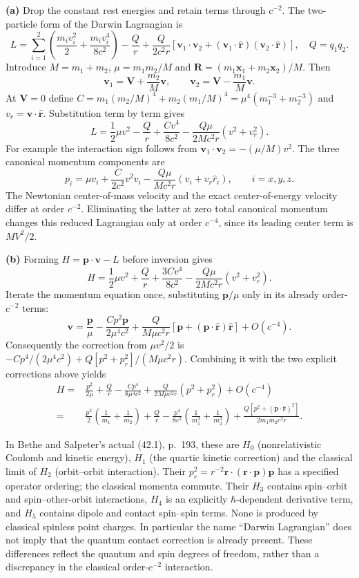 \medskip\noindent\textbf{(a)} Drop the constant rest energies and retain terms through $c^{-2}$.
The two-particle form of the Darwin Lagrangian is
\[
L=\sum_{i=1}^2\left(\frac{m_iv_i^2}2+\frac{m_iv_i^4}{8c^2}\right)
-\frac{Q}{r}+\frac{Q}{2c^2r}
 [\mathbf v_1\cdot\mathbf v_2+
 (\mathbf v_1\cdot\hat{\mathbf r})(\mathbf v_2\cdot\hat{\mathbf r})],
\quad Q=q_1q_2.
\]
Introduce $M=m_1+m_2$, $\mu=m_1m_2/M$ and
$\mathbf R=(m_1\mathbf x_1+m_2\mathbf x_2)/M$.
Then
\[
\mathbf v_1=\mathbf V+\frac{m_2}{M}\mathbf v,\qquad
\mathbf v_2=\mathbf V-\frac{m_1}{M}\mathbf v.
\]
At $\mathbf V=0$ define
$C=m_1(m_2/M)^4+m_2(m_1/M)^4
=\mu^4(m_1^{-3}+m_2^{-3})$ and $v_r=\mathbf v\cdot\hat{\mathbf r}$.
Substitution term by term gives
\[
\boxed{L=\frac12\mu v^2-\frac Qr+
 \frac{C v^4}{8c^2}-\frac{Q\mu}{2Mc^2r}(v^2+v_r^2).}
\]
For example the interaction sign follows from
$\mathbf v_1\cdot\mathbf v_2=-(\mu/M)v^2$.
The three canonical momentum components are
\[
\boxed{p_i=\mu v_i+\frac{C}{2c^2}v^2v_i
-\frac{Q\mu}{Mc^2r}(v_i+v_r\hat r_i),\qquad i=x,y,z.}
\]
The Newtonian center-of-mass velocity and the exact center-of-energy
velocity differ at order $c^{-2}$.  Eliminating the latter at zero
total canonical momentum changes this reduced Lagrangian only at
order $c^{-4}$, since its leading center term is $M V^2/2$.

\medskip\noindent\textbf{(b)} Forming $H=\mathbf p\cdot\mathbf v-L$ before inversion gives
\[
H=\frac12\mu v^2+\frac Qr+
 \frac{3Cv^4}{8c^2}-\frac{Q\mu}{2Mc^2r}(v^2+v_r^2).
\]
Iterate the momentum equation once, substituting $\mathbf p/\mu$
only in its already order-$c^{-2}$ terms:
\[
\mathbf v=\frac{\mathbf p}{\mu}
-\frac{C p^2\mathbf p}{2\mu^4c^2}
+\frac{Q}{M\mu c^2r}
 [\mathbf p+(\mathbf p\cdot\hat{\mathbf r})\hat{\mathbf r}]
+O(c^{-4}).
\]
Consequently the correction from $\mu v^2/2$ is
$-Cp^4/(2\mu^4c^2)+Q[p^2+p_r^2]/(M\mu c^2r)$.
Combining it with the two explicit corrections above yields
\begin{align*}
H={}&\frac{p^2}{2\mu}+\frac Qr
-\frac{Cp^4}{8\mu^4c^2}
+\frac{Q}{2M\mu c^2r}(p^2+p_r^2)+O(c^{-4})\\
={}&\boxed{\frac{p^2}{2}\left(\frac1{m_1}+\frac1{m_2}\right)+\frac Qr
-\frac{p^4}{8c^2}\left(\frac1{m_1^3}+\frac1{m_2^3}\right)
+\frac{Q[p^2+(\mathbf p\cdot\hat{\mathbf r})^2]}
 {2m_1m_2c^2r}.}
\end{align*}

In Bethe and Salpeter's actual (42.1), p.~193, these are $H_0$
(nonrelativistic Coulomb and kinetic energy), $H_1$ (the quartic
kinetic correction) and the classical limit of $H_2$ (orbit--orbit
interaction).  Their $p_r^2=r^{-2}\mathbf r\cdot(\mathbf r\cdot\mathbf p)\mathbf p$
has a specified operator ordering; the classical momenta commute.
Their $H_3$ contains spin--orbit and spin--other-orbit interactions,
$H_4$ is an explicitly $\hbar$-dependent derivative term, and $H_5$
contains dipole and contact spin--spin terms.  None is produced by
classical spinless point charges.  In particular the name ``Darwin
Lagrangian'' does not imply that the quantum contact correction is
already present.  These differences reflect the quantum and spin
degrees of freedom, rather than a discrepancy in the classical
order-$c^{-2}$ interaction.

